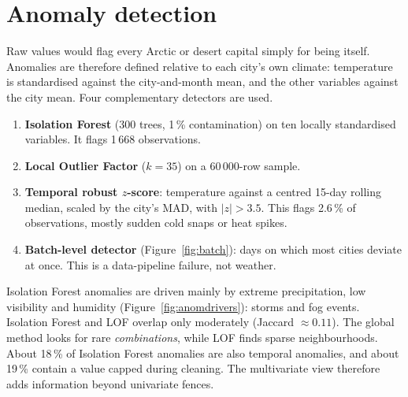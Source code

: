 \section{Anomaly detection}\label{sec:anomaly}
Raw values would flag every Arctic or desert capital simply for being itself. Anomalies are therefore defined
relative to each city's own climate: temperature is standardised against the city-and-month mean, and the
other variables against the city mean. Four complementary detectors are used.
\begin{enumerate}
  \item \textbf{Isolation Forest} (300 trees, 1\,\% contamination) on ten locally standardised variables.
        It flags 1\,668 observations.
  \item \textbf{Local Outlier Factor} ($k=35$) on a 60\,000-row sample.
  \item \textbf{Temporal robust $z$-score}: temperature against a centred 15-day rolling median, scaled by the
        city's MAD, with $|z|>3.5$. This flags 2.6\,\% of observations, mostly sudden cold snaps or heat spikes.
  \item \textbf{Batch-level detector} (Figure~\ref{fig:batch}): days on which most cities deviate at once.
        This is a data-pipeline failure, not weather.
\end{enumerate}

Isolation Forest anomalies are driven mainly by extreme precipitation, low visibility and humidity
(Figure~\ref{fig:anomdrivers}): storms and fog events. Isolation Forest and LOF overlap only moderately
(Jaccard $\approx 0.11$). The global method looks for rare \emph{combinations}, while LOF finds sparse
neighbourhoods. About 18\,\% of Isolation Forest anomalies are also temporal anomalies, and about 19\,\% contain
a value capped during cleaning. The multivariate view therefore adds information beyond univariate fences.

